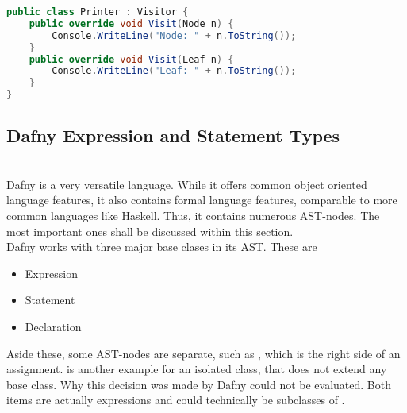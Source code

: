\begin{lstlisting}[language=csharp, caption={Example for Visitor}, captionpos=b, label={lst:visitor}]
public class Printer : Visitor {
    public override void Visit(Node n) {
        Console.WriteLine("Node: " + n.ToString());
    }
    public override void Visit(Leaf n) {
        Console.WriteLine("Leaf: " + n.ToString());
    }
}
\end{lstlisting}

\subsection{Dafny Expression and Statement Types}
\label{section:analysis_dafnyASTStuff}
\\


Dafny is a very versatile language. While it offers common object oriented language features, it also contains formal language features, comparable to more common languages like Haskell. Thus, it contains numerous AST-nodes. The most important ones shall be discussed within this section.\\

Dafny works with three major base clases in its AST. These are
\begin{itemize}
    \item Expression
    \item Statement
    \item Declaration
\end{itemize}
Aside these, some AST-nodes are separate, such as , which is the right side of an assignment.  is another example for an isolated class, that does not extend any base class. Why this decision was made by Dafny could not be evaluated. Both items are actually expressions and could technically be subclasses of .

